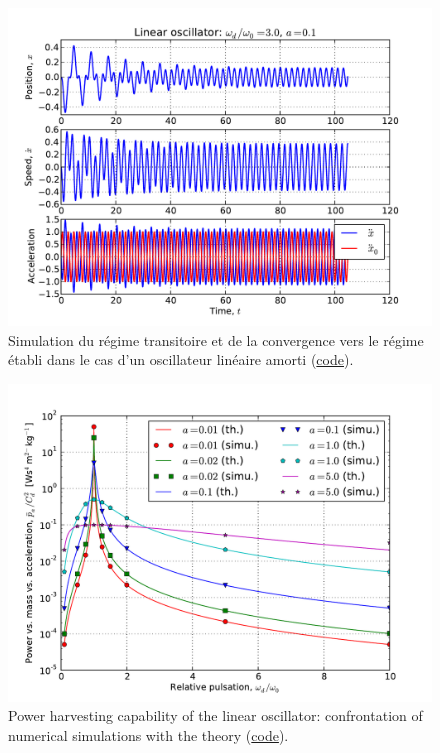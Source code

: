 \documentclass[a4paper,11pt,twoside]{article}
\begin{document}
\begin{figure}
\begin{center}
\includegraphics[width = 1.\textwidth]{../oscillators/example_code/linear_oscillator_signal.pdf}
\end{center}
\caption{Simulation du régime transitoire et de la convergence vers le régime établi dans le cas d'un oscillateur linéaire amorti (\href{https://github.com/lcharleux/oscillators/blob/master/oscillators/example_code/linear_oscillator_demo.py}{code}).}
\label{fig:linear_oscillator_power}
\end{figure}

\begin{figure}
\begin{center}
\includegraphics[width = 1.\textwidth]{../oscillators/example_code/linear_oscillator_power.pdf}
\end{center}
\caption{Power harvesting capability of the linear oscillator: confrontation of numerical simulations with the theory (\href{https://github.com/lcharleux/oscillators/blob/master/oscillators/example_code/linear_oscillator_power.py}{code}).}
\label{fig:linear_oscillator_power}
\end{figure}
\end{document}
